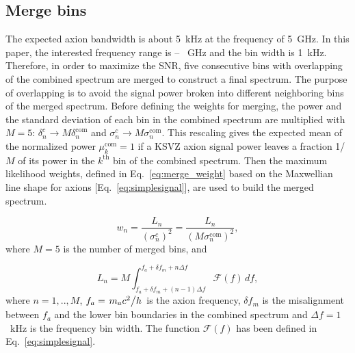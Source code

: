 
\subsection{Merge bins}
\label{sec:merge}

The expected axion bandwidth is about 5~kHz at the frequency of 5~GHz. In 
this paper, the interested frequency range is \flo -- \fhi~GHz and the bin 
width is 1~kHz. Therefore, in order to maximize the SNR, five consecutive 
bins with overlapping of the combined spectrum are merged to construct a 
final spectrum.
The purpose of overlapping is to avoid the signal power broken into different 
neighboring bins of the merged spectrum. Before defining the weights for 
merging, 
the power and the standard deviation of each bin in the combined spectrum are 
multiplied with $M=5$: $\delta^{c}_n \rightarrow M\delta^\text{com}_n$ and 
$\sigma^{c}_n \rightarrow M \sigma^\text{com}_n$. This rescaling gives the 
expected mean of the normalized power $\mu^\text{com}_k = 1$ if a KSVZ axion 
signal power leaves a fraction 1/$M$ of its power in the $k^\text{th}$ 
bin of the combined spectrum.
Then the maximum likelihood weights, defined in Eq.~\eqref{eq:merge_weight} 
based on the Maxwellian line shape for axions [Eq.~\eqref{eq:simplesignal}], 
are used to build the merged spectrum. 



\begin{equation}
    \label{eq:merge_weight}
    w_{n} = \frac{L_{n}}{(\sigma_{n}^{c})^{2}} = \frac{L_{n}}{(M\sigma_{n}^\text{com})^{2}},
\end{equation}
where $M = 5$ is the number of merged bins, and 


\begin{equation}
    \label{eq:Lq_integtal}
    L_{n} = M \int_{f_a +\delta f_m + (n-1)\Delta f}^{f_a +\delta f_m + n\Delta f} \mathcal{F}(f) \,df,
\end{equation}
where $n = 1,..,M$, $f_a=\left.m_a c^2\middle/h\right.$ is the axion frequency, 
$\delta f_m$ is the misalignment between $f_a$ and the lower bin 
boundaries in the combined spectrum and $\Delta f =1$~kHz is the frequency bin width. 
The function $\mathcal{F}(f)$ has been defined in Eq.~\eqref{eq:simplesignal}. 

